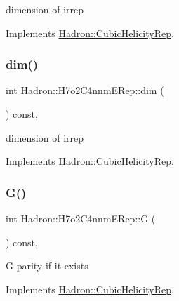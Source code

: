 dimension of irrep 

Implements \mbox{\hyperlink{structHadron_1_1CubicHelicityRep_a95d229a05580e65f8bdde74a1e316855}{Hadron\+::\+Cubic\+Helicity\+Rep}}.

\mbox{\label{structHadron_1_1H7o2C4nnmERep_ac2a28af759178ce1d0cf8ec5bd772198}} 
\subsubsection{\texorpdfstring{dim()}{dim()}\hspace{0.1cm}{\footnotesize\ttfamily [3/3]}}
{\footnotesize\ttfamily int Hadron\+::\+H7o2\+C4nnm\+E\+Rep\+::dim (\begin{DoxyParamCaption}{ }\end{DoxyParamCaption}) const\hspace{0.3cm}{\ttfamily [inline]}, {\ttfamily [virtual]}}

dimension of irrep 

Implements \mbox{\hyperlink{structHadron_1_1CubicHelicityRep_a95d229a05580e65f8bdde74a1e316855}{Hadron\+::\+Cubic\+Helicity\+Rep}}.

\mbox{\label{structHadron_1_1H7o2C4nnmERep_a55e0c3bf732ef6bd2ae6b0948fa7e21c}} 
\subsubsection{\texorpdfstring{G()}{G()}\hspace{0.1cm}{\footnotesize\ttfamily [1/3]}}
{\footnotesize\ttfamily int Hadron\+::\+H7o2\+C4nnm\+E\+Rep\+::G (\begin{DoxyParamCaption}{ }\end{DoxyParamCaption}) const\hspace{0.3cm}{\ttfamily [inline]}, {\ttfamily [virtual]}}

G-\/parity if it exists 

Implements \mbox{\hyperlink{structHadron_1_1CubicHelicityRep_a50689f42be1e6170aa8cf6ad0597018b}{Hadron\+::\+Cubic\+Helicity\+Rep}}.

\mbox{\label{structHadron_1_1H7o2C4nnmERep_a55e0c3bf732ef6bd2ae6b0948fa7e21c}} 
